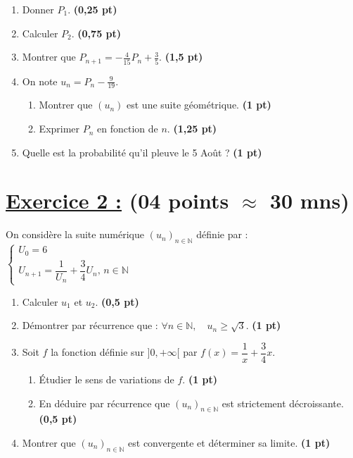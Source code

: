 \documentclass[12pt,a4paper]{article}
\begin{document}
\begin{enumerate}
    \item Donner $P_1$. \hfill \textbf{(0,25 pt)}
    \item Calculer $P_2$. \hfill \textbf{(0,75 pt)}
    \item Montrer que $P_{n+1} = -\frac{4}{15} P_n + \frac{3}{5}$. \hfill \textbf{(1,5 pt)}
    \item On note $u_n = P_n - \frac{9}{19}$.
    \begin{enumerate}
        \item Montrer que $(u_n)$ est une suite géométrique. \hfill \textbf{(1 pt)}
        \item Exprimer $P_n$ en fonction de $n$. \hfill \textbf{(1,25 pt)}
    \end{enumerate}
    \item Quelle est la probabilité qu'il pleuve le 5 Août ? \hfill \textbf{(1 pt)}
\end{enumerate}

\section*{\underline{Exercice 2 :} (04 points $\approx$ 30 mns)}
\noindent On considère la suite numérique $(u_n)_{n \in \mathbb{N}}$ définie par : 
$\begin{cases} 
U_0 = 6 \\ 
U_{n+1} = \dfrac{1}{U_n} + \dfrac{3}{4}U_n, \, n \in \mathbb{N} 
\end{cases}$

\begin{enumerate}
    \item Calculer $u_1$ et $u_2$. \hfill \textbf{(0,5 pt)}
    \item Démontrer par récurrence que : $\forall n \in \mathbb{N}, \quad u_n \ge \sqrt{3}$. \hfill \textbf{(1 pt)}
    \item Soit $f$ la fonction définie sur $]0, +\infty[$ par $f(x) = \dfrac{1}{x} + \dfrac{3}{4}x$.
    \begin{enumerate}
        \item Étudier le sens de variations de $f$. \hfill \textbf{(1 pt)}
        \item En déduire par récurrence que $(u_n)_{n \in \mathbb{N}}$ est strictement décroissante. \hfill \textbf{(0,5 pt)}
    \end{enumerate}
    \item Montrer que $(u_n)_{n \in \mathbb{N}}$ est convergente et déterminer sa limite. \hfill \textbf{(1 pt)}
\end{enumerate}
\end{document}
